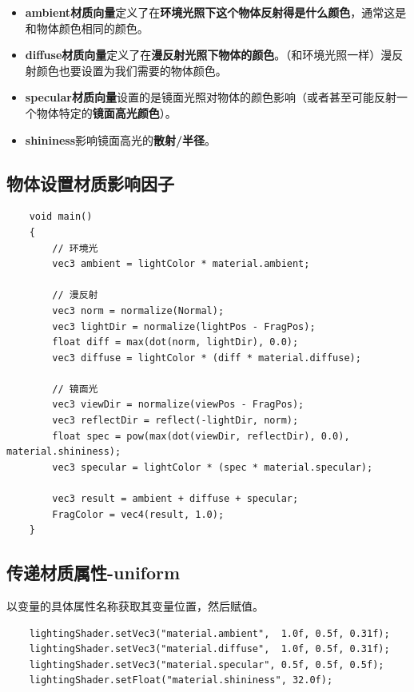 \documentclass[UTF8,a4paper,12pt]{ctexbook}
\begin{document}
		\begin{itemize}
			\item \textbf{ambient材质向量}定义了在\textbf{环境光照下这个物体反射得是什么颜色}，通常这是和物体颜色相同的颜色。
			\item \textbf{diffuse材质向量}定义了在\textbf{漫反射光照下物体的颜色}。（和环境光照一样）漫反射颜色也要设置为我们需要的物体颜色。
			\item \textbf{specular材质向量}设置的是镜面光照对物体的颜色影响（或者甚至可能反射一个物体特定的\textbf{镜面高光颜色}）。
			\item \textbf{shininess}影响镜面高光的\textbf{散射/半径}。
		\end{itemize}
		
		\subsection{物体设置材质影响因子}
			\begin{lstlisting}
	void main()
	{    
	    // 环境光
	    vec3 ambient = lightColor * material.ambient;
	
	    // 漫反射 
	    vec3 norm = normalize(Normal);
	    vec3 lightDir = normalize(lightPos - FragPos);
	    float diff = max(dot(norm, lightDir), 0.0);
	    vec3 diffuse = lightColor * (diff * material.diffuse);
	
	    // 镜面光
	    vec3 viewDir = normalize(viewPos - FragPos);
	    vec3 reflectDir = reflect(-lightDir, norm);  
	    float spec = pow(max(dot(viewDir, reflectDir), 0.0), material.shininess);
	    vec3 specular = lightColor * (spec * material.specular);  
	
	    vec3 result = ambient + diffuse + specular;
	    FragColor = vec4(result, 1.0);
	}	
			\end{lstlisting}
		
		
		\subsection{传递材质属性-uniform}
		
			以变量的具体属性名称获取其变量位置，然后赋值。
		
			\begin{lstlisting}
	lightingShader.setVec3("material.ambient",  1.0f, 0.5f, 0.31f);
	lightingShader.setVec3("material.diffuse",  1.0f, 0.5f, 0.31f);
	lightingShader.setVec3("material.specular", 0.5f, 0.5f, 0.5f);
	lightingShader.setFloat("material.shininess", 32.0f);			
			\end{lstlisting}
		
\end{document}
